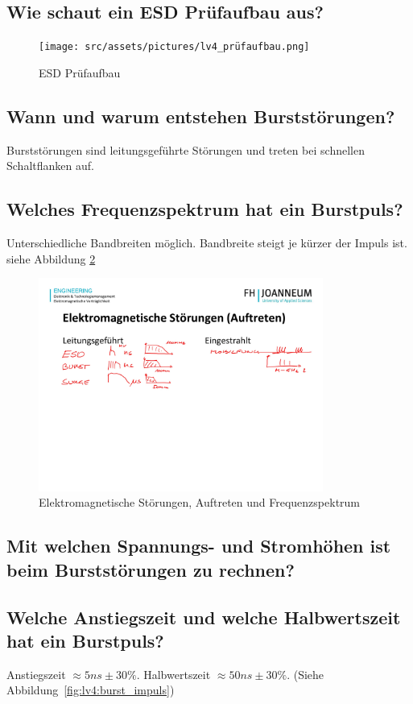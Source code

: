 \subsection{Wie schaut ein ESD Prüfaufbau aus?}
\begin{figure}[!ht]
  \centering
  \texttt{[image: src/assets/pictures/lv4\_prüfaufbau.png]}
  \caption{ESD Prüfaufbau}\label{fig:lv4:esd_test}
\end{figure}

\subsection{Wann und warum entstehen Burststörungen?}
Burststörungen sind leitungsgeführte Störungen und treten bei schnellen Schaltflanken auf.

\subsection{Welches Frequenzspektrum hat ein Burstpuls?}
Unterschiedliche Bandbreiten möglich. Bandbreite steigt je kürzer der Impuls ist.\\
siehe Abbildung \ref{fig:lv4:electro_interferences}
\begin{figure}[ht]
  \centering
  \includegraphics[height=7cm]{src/assets/pictures/lv4_elektromagnetische_stoerungen.jpg}
  \caption{Elektromagnetische Störungen, Auftreten und Frequenzspektrum}\label{fig:lv4:electro_interferences}
\end{figure}

\subsection{Mit welchen Spannungs- und Stromhöhen ist beim Burststörungen zu rechnen?}

\subsection{Welche Anstiegszeit und welche Halbwertszeit hat ein Burstpuls?}
Anstiegszeit \(\approx 5ns \pm 30\%\). Halbwertszeit \(\approx 50ns \pm 30\%\). (Siehe Abbildung~\ref{fig:lv4:burst_impuls})

